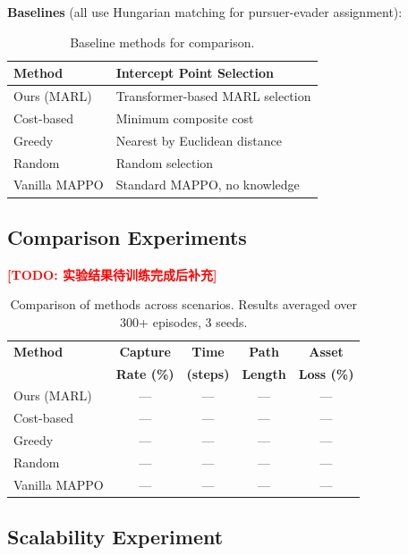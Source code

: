 \documentclass[10pt,conference]{IEEEtran}
\newcommand{\marktodo}[1]{\textcolor{red}{\textbf{[TODO: #1]}}}
\begin{document}
\textbf{Baselines} (all use Hungarian matching for pursuer-evader assignment):

\begin{table}[h]
\centering
\caption{Baseline methods for comparison.}
\label{tab:baselines}
\begin{tabular}{@{}ll@{}}
\toprule
\textbf{Method} & \textbf{Intercept Point Selection} \\
\midrule
Ours (MARL) & Transformer-based MARL selection \\
Cost-based & Minimum composite cost \\
Greedy & Nearest by Euclidean distance \\
Random & Random selection \\
Vanilla MAPPO & Standard MAPPO, no knowledge \\
\bottomrule
\end{tabular}
\end{table}

\subsection{Comparison Experiments}

\marktodo{实验结果待训练完成后补充}

\begin{table}[h]
\centering
\caption{Comparison of methods across scenarios. Results averaged over 300+ episodes, 3 seeds.}
\label{tab:comparison}
\begin{tabular}{@{}lcccc@{}}
\toprule
\textbf{Method} & \textbf{Capture} & \textbf{Time} & \textbf{Path} & \textbf{Asset} \\
 & \textbf{Rate (\%)} & \textbf{(steps)} & \textbf{Length} & \textbf{Loss (\%)} \\
\midrule
Ours (MARL) & --- & --- & --- & --- \\
Cost-based & --- & --- & --- & --- \\
Greedy & --- & --- & --- & --- \\
Random & --- & --- & --- & --- \\
Vanilla MAPPO & --- & --- & --- & --- \\
\bottomrule
\end{tabular}
\end{table}

\subsection{Scalability Experiment}
\end{document}

